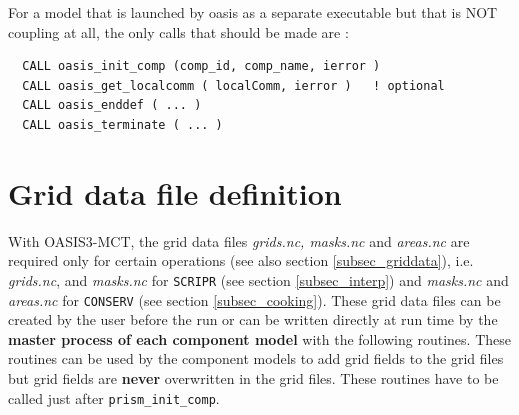 For a model that is launched by oasis as a separate executable but that is NOT coupling at all, 
the only calls that should be made are :

\begin{verbatim}
  CALL oasis_init_comp (comp_id, comp_name, ierror )
  CALL oasis_get_localcomm ( localComm, ierror )   ! optional
  CALL oasis_enddef ( ... )
  CALL oasis_terminate ( ... )
\end{verbatim}

\section{Grid data file definition}
\label{subsubsec_griddef}

With OASIS3-MCT, the grid data files {\em grids.nc, masks.nc} and {\em
  areas.nc} are required only for certain operations (see also
section \ref{subsec_griddata}), i.e.  {\em grids.nc}, and {\em
  masks.nc} for {\tt SCRIPR} (see section
\ref{subsec_interp}) and {\em masks.nc} and {\em areas.nc} 
for {\tt CONSERV} (see section \ref{subsec_cooking}). These grid data files can be
created by the user before the run or can be written directly at run
time by the {\bf master process of each component model} with the following
routines.  These routines can be used by the component models to add
grid fields to the grid files but grid fields
are {\bf never} overwritten in the grid files. These routines have to
be called just after {\tt prism\_init\_comp}.

